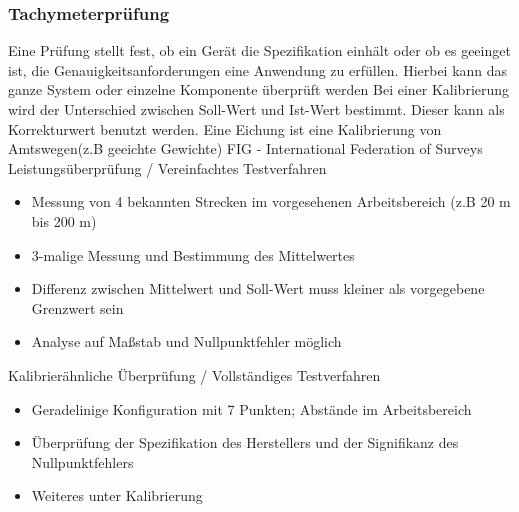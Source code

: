 \documentclass[12pt]{article}
\begin{document}
\subsubsection{Tachymeterprüfung}
Eine Prüfung stellt fest, ob ein Gerät die Spezifikation einhält oder ob es geeinget ist, die Genauigkeitsanforderungen eine Anwendung zu erfüllen. \newline
\newline
Hierbei kann das ganze System oder einzelne Komponente überprüft werden \newline
\newline
Bei einer Kalibrierung wird der Unterschied zwischen Soll-Wert und Ist-Wert bestimmt. Dieser kann als Korrekturwert benutzt werden. \newline
\newline 
Eine Eichung ist eine Kalibrierung von Amtswegen(z.B geeichte Gewichte) \newline
\newline
FIG - International Federation of Surveys\newline
Leistungsüberprüfung / Vereinfachtes Testverfahren
\begin{itemize}
	\item Messung von 4 bekannten Strecken im vorgesehenen Arbeitsbereich (z.B 20 m bis 200 m)
	\item 3-malige Messung und Bestimmung des Mittelwertes
	\item Differenz zwischen Mittelwert und Soll-Wert muss kleiner als vorgegebene Grenzwert sein
	\item Analyse auf Maßstab und Nullpunktfehler möglich
\end{itemize}
Kalibrierähnliche Überprüfung / Vollständiges Testverfahren
\begin{itemize}
	\item Geradelinige Konfiguration mit 7 Punkten; Abstände im Arbeitsbereich
	\item Überprüfung der Spezifikation des Herstellers und der Signifikanz des Nullpunktfehlers
	\item Weiteres unter Kalibrierung
\end{itemize}
\end{document}
